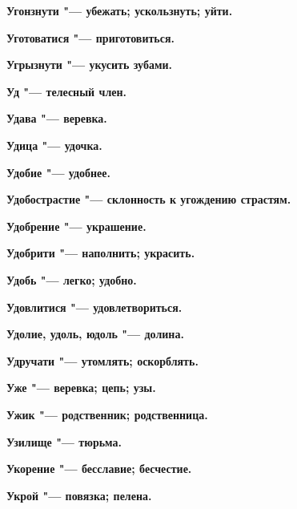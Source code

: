 \begin{mymulticols}{2}
\bfseries Угонзнути\normalfont{} "--- убежать; ускользнуть; уйти. 




\bfseries Уготоватися\normalfont{} "--- приготовиться. 




\bfseries Угрызнути\normalfont{} "--- укусить зубами. 




\bfseries Уд\normalfont{} "--- телесный член. 




\bfseries Удава\normalfont{} "--- веревка. 




\bfseries Удица\normalfont{} "--- удочка. 




\bfseries Удобие\normalfont{} "--- удобнее. 




\bfseries Удобострастие\normalfont{} "--- склонность к угождению страстям. 




\bfseries Удобрение\normalfont{} "--- украшение. 




\bfseries Удобрити\normalfont{} "--- наполнить; украсить. 




\bfseries Удобь\normalfont{} "--- легко; удобно. 




\bfseries Удовлитися\normalfont{} "--- удовлетвориться. 




\bfseries Удолие, удоль, юдоль\normalfont{} "--- долина. 




\bfseries Удручати\normalfont{} "--- утомлять; оскорблять. 




\bfseries Уже\normalfont{} "--- веревка; цепь; узы. 




\bfseries Ужик\normalfont{} "--- родственник; родственница. 




\bfseries Узилище\normalfont{} "--- тюрьма. 




\bfseries Укорение\normalfont{} "--- бесславие; бесчестие. 




\bfseries Укрой\normalfont{} "--- повязка; пелена. 





\end{mymulticols}
